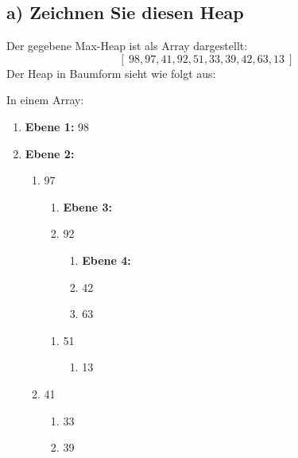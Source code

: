\documentclass{article}
\begin{document}
\subsection*{a) Zeichnen Sie diesen Heap}
Der gegebene Max-Heap ist als Array dargestellt: 
\[[\  98, 97, 41, 92, 51, 33, 39, 42, 63, 13\ ]\]
Der Heap in Baumform sieht wie folgt aus:
\begin{center}
\end{center}
In einem Array:
\begin{enumerate}[label=]
    \item \textbf{Ebene 1:} 98
    \item \textbf{Ebene 2:} 
    \begin{enumerate}[label=]
        \item 97
        \begin{enumerate}[label=]
            \item \textbf{Ebene 3:}
            \item 92
            \begin{enumerate}[label=]
                \item \textbf{Ebene 4:}
                \item 42
                \item 63
            \end{enumerate}
        \end{enumerate}
        \begin{enumerate}[label=]
            \item 51
            \begin{enumerate}[label=]
                \item 13
            \end{enumerate}
        \end{enumerate}
        \item 41
        \begin{enumerate}[label=]
            \item 33
            \item 39
        \end{enumerate}
    \end{enumerate}
\end{enumerate}
\newpage
\end{document}
